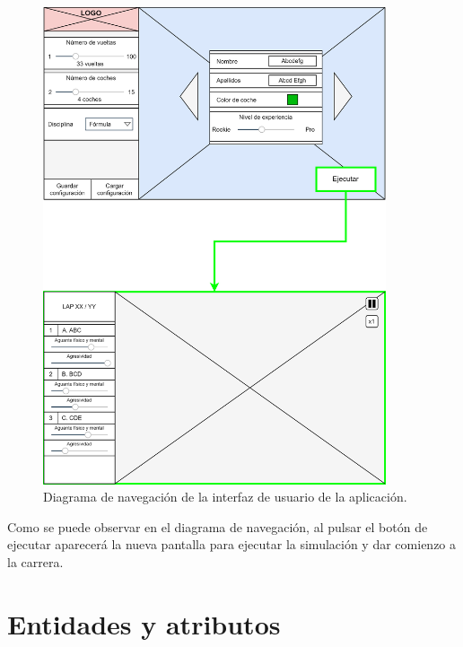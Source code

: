 \begin{figure}[H]
    \centering
    \includegraphics[width=0.9\textwidth]{imagenes/nav.png}
    \caption{Diagrama de navegación de la interfaz de usuario de la aplicación.}
 \end{figure}

Como se puede observar en el diagrama de navegación, al pulsar el botón de ejecutar aparecerá la nueva pantalla para ejecutar la simulación y dar comienzo a la carrera.


\section{Entidades y atributos}

